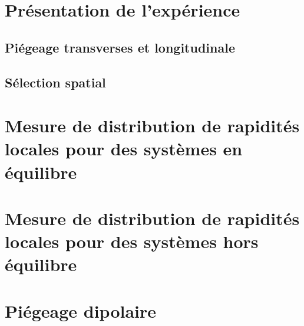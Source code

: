 \chapter{Présentation de l’expérience}
\minitoc
\section{Piégeage transverses et longitudinale}
\section{Sélection spatial}

\chapter{Mesure de distribution de rapidités locales pour des systèmes en équilibre}

\chapter{Mesure de distribution de rapidités locales pour des systèmes hors équilibre}

\chapter{Piégeage dipolaire}


			            

